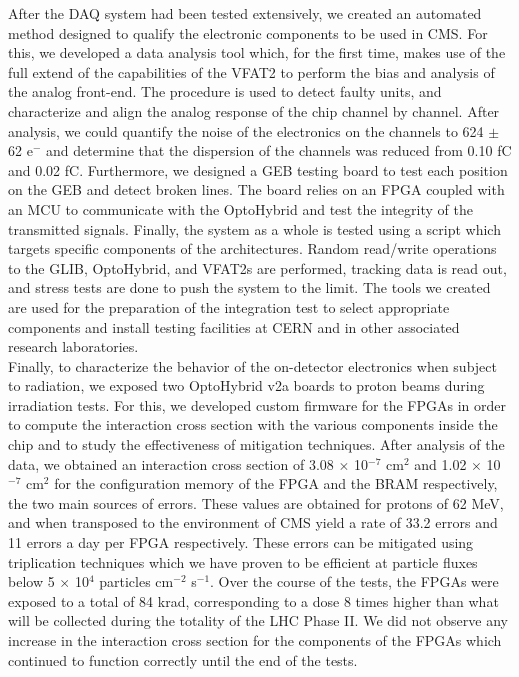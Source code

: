   After the DAQ system had been tested extensively, we created an automated method designed to qualify the electronic components to be used in CMS. For this, we developed a data analysis tool which, for the first time, makes use of the full extend of the capabilities of the VFAT2 to perform the bias and analysis of the analog front-end. The procedure is used to detect faulty units, and characterize and align the analog response of the chip channel by channel. After analysis, we could quantify the noise of the electronics on the channels to 624 $\pm$ 62 e$^-$ and determine that the dispersion of the channels was reduced from 0.10 fC and 0.02 fC. Furthermore, we designed a GEB testing board to test each position on the GEB and detect broken lines. The board relies on an FPGA coupled with an MCU to communicate with the OptoHybrid and test the integrity of the transmitted signals. Finally, the system as a whole is tested using a script which targets specific components of the architectures. Random read/write operations to the GLIB, OptoHybrid, and VFAT2s are performed, tracking data is read out, and stress tests are done to push the system to the limit. The tools we created are used for the preparation of the integration test to select appropriate components and install testing facilities at CERN and in other associated research laboratories. \\

  Finally, to characterize the behavior of the on-detector electronics when subject to radiation, we exposed two OptoHybrid v2a boards to proton beams during irradiation tests. For this, we developed custom firmware for the FPGAs in order to compute the interaction cross section with the various components inside the chip and to study the effectiveness of mitigation techniques. After analysis of the data, we obtained an interaction cross section of 3.08 $ \times $ 10$^{-7}$ cm$^{2}$ and 1.02 $ \times $ 10$^{-7}$ cm$^{2}$ for the configuration memory of the FPGA and the BRAM respectively, the two main sources of errors. These values are obtained for protons of 62 MeV, and when transposed to the environment of CMS yield a rate of 33.2 errors and 11 errors a day per FPGA respectively. These errors can be mitigated using triplication techniques which we have proven to be efficient at particle fluxes below 5 $ \times $ 10$^4$ particles cm$^{-2}$ s$^{-1}$. Over the course of the tests, the FPGAs were exposed to a total of 84 krad, corresponding to a dose 8 times higher than what will be collected during the totality of the LHC Phase II. We did not observe any increase in the interaction cross section for the components of the FPGAs which continued to function correctly until the end of the tests. \\

